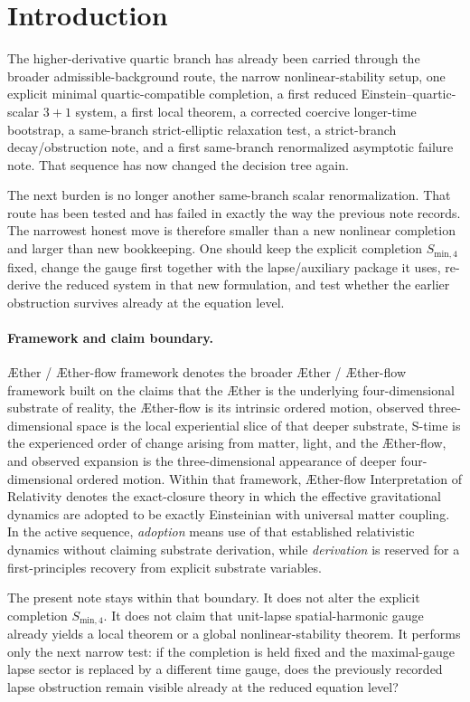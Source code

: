 \documentclass[11pt]{article}
\newcommand{\Aether}{\AE{}ther}
\newcommand{\Aflow}{\AE{}ther-flow}
\newcommand{\TheoryName}{\Aflow{} Interpretation of Relativity}
\newcommand{\TheoryProgram}{\Aether{} / \Aflow{} framework}
\begin{document}
\section{Introduction}

The higher-derivative quartic branch has already been carried through the broader admissible-background route, the narrow nonlinear-stability setup, one explicit minimal quartic-compatible completion, a first reduced Einstein--quartic-scalar \(3+1\) system, a first local theorem, a corrected coercive longer-time bootstrap, a same-branch strict-elliptic relaxation test, a strict-branch decay/obstruction note, and a first same-branch renormalized asymptotic failure note. That sequence has now changed the decision tree again.

The next burden is no longer another same-branch scalar renormalization. That route has been tested and has failed in exactly the way the previous note records. The narrowest honest move is therefore smaller than a new nonlinear completion and larger than new bookkeeping. One should keep the explicit completion \(S_{\mathrm{min},4}\) fixed, change the gauge first together with the lapse/auxiliary package it uses, re-derive the reduced system in that new formulation, and test whether the earlier obstruction survives already at the equation level.

\paragraph{Framework and claim boundary.}
\TheoryProgram{} denotes the broader \Aether{} / \Aflow{} framework built on the claims that the \Aether{} is the underlying four-dimensional substrate of reality, the \Aflow{} is its intrinsic ordered motion, observed three-dimensional space is the local experiential slice of that deeper substrate, S-time is the experienced order of change arising from matter, light, and the \Aflow{}, and observed expansion is the three-dimensional appearance of deeper four-dimensional ordered motion. Within that framework, \TheoryName{} denotes the exact-closure theory in which the effective gravitational dynamics are adopted to be exactly Einsteinian with universal matter coupling. In the active sequence, \emph{adoption} means use of that established relativistic dynamics without claiming substrate derivation, while \emph{derivation} is reserved for a first-principles recovery from explicit substrate variables.

The present note stays within that boundary. It does not alter the explicit completion \(S_{\mathrm{min},4}\). It does not claim that unit-lapse spatial-harmonic gauge already yields a local theorem or a global nonlinear-stability theorem. It performs only the next narrow test: if the completion is held fixed and the maximal-gauge lapse sector is replaced by a different time gauge, does the previously recorded lapse obstruction remain visible already at the reduced equation level?
\end{document}
